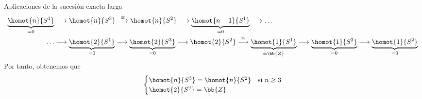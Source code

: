 \begin{frame}[fragile]{Aplicaciones de la sucesión exacta larga}
\begin{align*}
\underbrace{\homot{n}{S^1}}_{\text{=0}} &\longrightarrow \homot{n}{S^3} \stackrel{\cong}{\longrightarrow} \homot{n}{S^2} \longrightarrow \underbrace{\homot{n-1}{S^1}}_{\text{=0}} \longrightarrow \dots \\ 
\dots &\longrightarrow \underbrace{\homot{2}{S^1}}_{\text{=0}} \longrightarrow \underbrace{\homot{2}{S^3}}_{\text{=0}} \longrightarrow \homot{2}{S^2} \stackrel{\cong}{\longrightarrow} \underbrace{\homot{1}{S^1}}_{\text{=}\bb{Z}} \longrightarrow \underbrace{\homot{1}{S^3}}_{\text{=0}} \longrightarrow \underbrace{\homot{1}{S^2}}_{\text{=0}}
\end{align*}
Por tanto, obtenemos que
\[
\begin{cases}
\homot{n}{S^3} = \homot{n}{S^2} & \text{si } n \geq 3 \\
\homot{2}{S^2} = \bb{Z}
\end{cases}
\]
\end{frame}